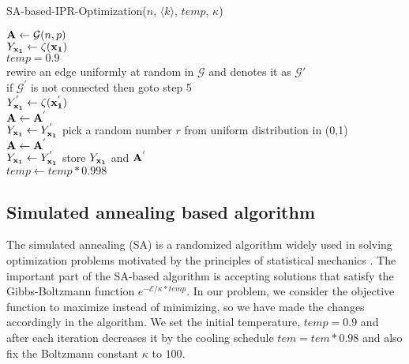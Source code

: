 \documentclass[envcountreset,oribibl]{llncs}
\begin{document}
\begin{algorithm}[!htb]
\label{SA}
\caption{SA-based-IPR-Optimization($n$, $\langle k \rangle$, $temp$, $\kappa$) }
\Indp 
${\bf A} \leftarrow \mathcal{G}(n,p)$\\
$Y_{\bf x_1} \leftarrow \zeta(\bf x_1)$\\
$temp = 0.9$\\
{
  rewire an edge uniformly at random in $\mathcal{G}$ and denotes it as $\mathcal{G'}$ \\
  if $\mathcal{G^{'}}$ is not connected then goto step 5\\
  $Y_{\bf x_1}^{'} \leftarrow \zeta(\bf x_1^{'})$\\
      {
         ${\bf A} \leftarrow {\bf A^{'}}$  \\
         $Y_{\bf x_1} \leftarrow Y_{\bf x_1}^{'}$
       }
   \Else
   {
    pick a random number $r$ from uniform distribution in (0,1) \\
     { 
        ${\bf A} \leftarrow {\bf A^{'}}$  \\
         $Y_{\bf x_1} \leftarrow Y_{\bf x_1}^{'}$
     }
   }
  store $Y_{\bf x_1}$ and ${\bf A^{'}}$\\
  $temp \leftarrow temp*0.998$
}  
\Indm
\end{algorithm}
\subsection{Simulated annealing based algorithm}
The simulated annealing (SA) is a randomized algorithm widely used in solving optimization problems motivated by the principles of statistical mechanics \cite{simuated_annealing_1983}. The important part of the SA-based algorithm is accepting solutions that satisfy the Gibbs-Boltzmann function $e^{-\mathcal{E}/\kappa*temp}$. In our problem, we consider the objective function to maximize instead of minimizing, so we have made the changes accordingly in the algorithm. We set the initial temperature, $temp=0.9$ and after each iteration decreases it by the cooling schedule $tem=tem*0.98$ and also fix the Boltzmann constant $\kappa$ to $100$. 
\end{document}
